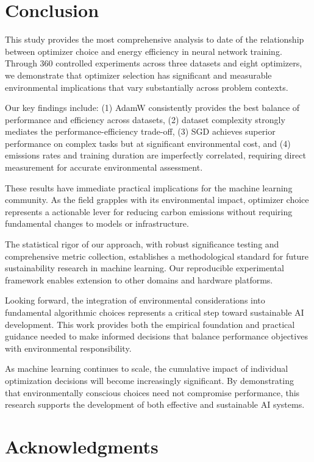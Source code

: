 \documentclass[conference]{IEEEtran}
\begin{document}
\section{Conclusion}

This study provides the most comprehensive analysis to date of the relationship between optimizer choice and energy efficiency in neural network training. Through 360 controlled experiments across three datasets and eight optimizers, we demonstrate that optimizer selection has significant and measurable environmental implications that vary substantially across problem contexts.

Our key findings include: (1) AdamW consistently provides the best balance of performance and efficiency across datasets, (2) dataset complexity strongly mediates the performance-efficiency trade-off, (3) SGD achieves superior performance on complex tasks but at significant environmental cost, and (4) emissions rates and training duration are imperfectly correlated, requiring direct measurement for accurate environmental assessment.

These results have immediate practical implications for the machine learning community. As the field grapples with its environmental impact, optimizer choice represents a actionable lever for reducing carbon emissions without requiring fundamental changes to models or infrastructure.

The statistical rigor of our approach, with robust significance testing and comprehensive metric collection, establishes a methodological standard for future sustainability research in machine learning. Our reproducible experimental framework enables extension to other domains and hardware platforms.

Looking forward, the integration of environmental considerations into fundamental algorithmic choices represents a critical step toward sustainable AI development. This work provides both the empirical foundation and practical guidance needed to make informed decisions that balance performance objectives with environmental responsibility.

As machine learning continues to scale, the cumulative impact of individual optimization decisions will become increasingly significant. By demonstrating that environmentally conscious choices need not compromise performance, this research supports the development of both effective and sustainable AI systems.

\section*{Acknowledgments}
\end{document}
